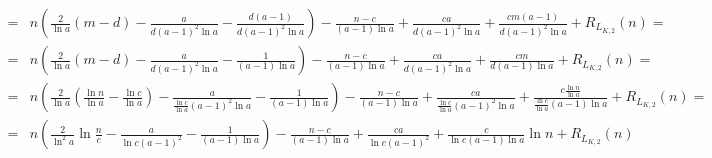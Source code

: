 \documentclass{article}
\begin{document}
\begin{align*}
=& n \left( \frac{2}{\ln{a}} \left( m - d \right) - \frac{a}{d (a-1)^2 \ln{a}} - \frac{ d ( a - 1 )}{d (a-1)^2 \ln{a}} \right) - \frac{n - c}{(a-1) \ln{a}} + \frac{c a}{d (a-1)^2 \ln{a}} + \frac{c m ( a - 1 )}{d (a-1)^2 \ln{a}} + R_{L_{K,2}}(n) = \\
=& n \left( \frac{2}{\ln{a}} \left( m - d \right) - \frac{a}{d (a-1)^2 \ln{a}} - \frac{1}{(a-1) \ln{a}} \right) - \frac{n - c}{(a-1) \ln{a}} + \frac{c a}{d (a-1)^2 \ln{a}} + \frac{c m}{d (a-1) \ln{a}} + R_{L_{K,2}}(n) = \\
=& n \left( \frac{2}{\ln{a}} \left( \frac{\ln{n}}{\ln{a}} - \frac{\ln{c}}{\ln{a}} \right) - \frac{a}{\frac{\ln{c}}{\ln{a}} (a-1)^2 \ln{a}} - \frac{1}{(a-1) \ln{a}} \right) - \frac{n - c}{(a-1) \ln{a}} + \frac{c a}{\frac{\ln{c}}{\ln{a}} (a-1)^2 \ln{a}} + \frac{c \frac{\ln{n}}{\ln{a}}}{\frac{\ln{c}}{\ln{a}} (a-1) \ln{a}} + R_{L_{K,2}}(n) = \\
=& n \left( \frac{2}{\ln^2{a}} \ln{\frac{n}{c}} - \frac{a}{\ln{c} (a-1)^2} - \frac{1}{(a-1) \ln{a}} \right) - \frac{n - c}{(a-1) \ln{a}} + \frac{c a}{\ln{c} (a-1)^2} + \frac{c}{\ln{c} (a-1) \ln{a}} \ln{n} + R_{L_{K,2}}(n)
\end{align*}
\end{document}
